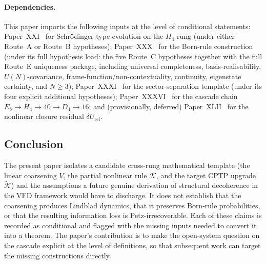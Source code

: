 \documentclass[12pt]{article}
\theoremstyle{definition}
\theoremstyle{remark}
\newcommand{\Kcal}{\mathcal{K}}
\begin{document}
\paragraph{Dependencies.} This paper imports the following inputs at the level of conditional statements: Paper~XXI~\citep{SmartXXI} for Schr\"odinger-type evolution on the $H_4$ rung (under either Route~A or Route~B hypotheses); Paper~XXX~\citep{SmartXXX} for the Born-rule construction (under its full hypothesis load: the five Route~C hypotheses together with the full Route~E uniqueness package, including universal completeness, basis-realisability, $U(N)$-covariance, frame-function/non-contextuality, continuity, eigenstate certainty, and $N\ge 3$); Paper~XXXI~\citep{SmartXXXI} for the sector-separation template (under its four explicit additional hypotheses); Paper~XXXVI~\citep{SmartXXXVI} for the cascade chain $E_8 \to H_4 \to 40 \to D_4 \to 16$; and (provisionally, deferred) Paper~XLII~\citep{SmartXLII} for the nonlinear closure residual $\delta U_{\mathrm{rel}}$.

\subsection{Conclusion}
The present paper isolates a candidate cross-rung mathematical template (the linear coarsening $V$, the partial nonlinear rule $\Kcal$, and the target CPTP upgrade $\widetilde{\Kcal}$) and the assumptions a future genuine derivation of structural decoherence in the VFD framework would have to discharge. It does not establish that the coarsening produces Lindblad dynamics, that it preserves Born-rule probabilities, or that the resulting information loss is Petz-irrecoverable. Each of these claims is recorded as conditional and flagged with the missing inputs needed to convert it into a theorem. The paper's contribution is to make the open-system question on the cascade explicit at the level of definitions, so that subsequent work can target the missing constructions directly.
\end{document}
